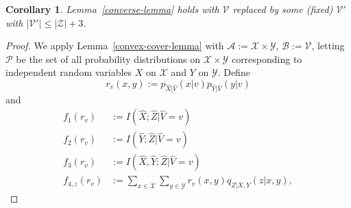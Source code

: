 \documentclass[journal]{IEEEtran}
\newcommand{\channelpmf}{q}
\newcommand{\codebookpmf}{p}
\newcommand{\generalpmf}{r}
\newcommand{\generalrvOneAlph}{\mathcal{A}}
\newcommand{\generalrvTwoAlph}{\mathcal{B}}
\newcommand{\generalpmfset}{\mathcal{P}}
\newcommand{\generalfunction}{f}
\newcommand{\channelInOne}{X}
\newcommand{\channelInOneAlph}{\mathcal{X}}
\newcommand{\channelInOneAlphElement}{x}
\newcommand{\channelInTwo}{Y}
\newcommand{\channelInTwoAlph}{\mathcal{Y}}
\newcommand{\channelInTwoAlphElement}{y}
\newcommand{\channelOut}{Z}
\newcommand{\channelOutAlph}{\mathcal{Z}}
\newcommand{\channelOutAlphElement}{z}
\newcommand{\mutualInformationConditional}[3]{I(#1;#2|#3)}
\newcommand{\cardinality}[1]{\lvert #1 \rvert}
\newcommand{\timeSharingRV}{V}
\newcommand{\timeSharingAlph}{\mathcal{V}}
\newcommand{\timeSharingAlphElement}{v}
\newtheorem{cor}{Corollary}
\begin{document}
\begin{cor}
\label{converse-cor}
Lemma~\ref{converse-lemma} holds with $\timeSharingAlph$ replaced by some (fixed) $\timeSharingAlph'$ with $\cardinality{\timeSharingAlph'} \leq \cardinality{\channelOutAlph} + 3$.
\end{cor}
\begin{proof}
We apply Lemma~\ref{convex-cover-lemma} with $\generalrvOneAlph := \channelInOneAlph \times \channelInTwoAlph$, $\generalrvTwoAlph := \timeSharingAlph$, letting $\generalpmfset$ be the set of all probability distributions on $ \channelInOneAlph \times \channelInTwoAlph$ corresponding to independent random variables $\channelInOne$ on $\channelInOneAlph$ and $\channelInTwo$ on $\channelInTwoAlph$. Define
\[
\generalpmf_\timeSharingAlphElement(\channelInOneAlphElement, \channelInTwoAlphElement) := \codebookpmf_{\hat{\channelInOne} | \hat{\timeSharingRV}}(\channelInOneAlphElement | \timeSharingAlphElement) \codebookpmf_{\hat{\channelInTwo} | \hat{\timeSharingRV}}(\channelInTwoAlphElement | \timeSharingAlphElement)
\]
and
\begin{align*}
\generalfunction_1(\generalpmf_\timeSharingAlphElement)
&:=
\mutualInformationConditional{\hat{\channelInOne}}{\hat{\channelOut}}{\hat{\timeSharingRV} = \timeSharingAlphElement}
\\
\generalfunction_2(\generalpmf_\timeSharingAlphElement)
&:=
\mutualInformationConditional{\hat{\channelInTwo}}{\hat{\channelOut}}{\hat{\timeSharingRV} = \timeSharingAlphElement}
\\
\generalfunction_3(\generalpmf_\timeSharingAlphElement)
&:=
\mutualInformationConditional{\hat{\channelInOne},\hat{\channelInTwo}}{\hat{\channelOut}}{\hat{\timeSharingRV} = \timeSharingAlphElement}
\\
\generalfunction_{4, \channelOutAlphElement}(\generalpmf_\timeSharingAlphElement)
&:=
\sum\limits_{\channelInOneAlphElement \in \channelInOneAlph}
\sum\limits_{\channelInTwoAlphElement \in \channelInTwoAlph}
  \generalpmf_\timeSharingAlphElement(\channelInOneAlphElement, \channelInTwoAlphElement)
  \channelpmf_{\channelOut | \channelInOne, \channelInTwo}(\channelOutAlphElement | \channelInOneAlphElement, \channelInTwoAlphElement),
\end{align*}

\end{proof}
\end{document}
